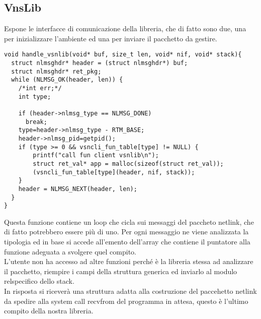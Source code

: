 \subsection{VnsLib}
Espone le interfacce di comunicazione della libreria, che di fatto sono due, una per inizializzare l'ambiente ed una per inviare il pacchetto da gestire.\\
\begin{lstlisting}[style=CStyle]
void handle_vsnlib(void* buf, size_t len, void* nif, void* stack){
  struct nlmsghdr* header = (struct nlmsghdr*) buf;
  struct nlmsghdr* ret_pkg;
  while (NLMSG_OK(header, len)) {
    /*int err;*/
    int type;

    if (header->nlmsg_type == NLMSG_DONE)
      break;
    type=header->nlmsg_type - RTM_BASE;
    header->nlmsg_pid=getpid();
    if (type >= 0 && vsncli_fun_table[type] != NULL) {
        printf("call fun client vsnlib\n");
        struct ret_val* app = malloc(sizeof(struct ret_val));
        (vsncli_fun_table[type](header, nif, stack));
    }
    header = NLMSG_NEXT(header, len);
  }
}
\end{lstlisting}
Questa funzione contiene un loop che cicla sui messaggi del paccheto netlink, che di fatto potrebbero essere pi\`u di uno. Per ogni messaggio ne viene analizzata la tipologia ed in base si accede all'emento dell'array che contiene il puntatore alla funzione adeguata a svolgere quel compito.\\
L'utente non ha accesso ad altre funzioni perch\'e \`e la libreria stessa ad analizzare il pacchetto, riempire i campi della struttura generica ed inviarlo al modulo relspecifico dello stack.\\
In risposta si ricever\`a una struttura adatta alla costruzione del paccehetto netlink da spedire alla system call recvfrom del programma in attesa, questo \`e l'ultimo compito della nostra libreria.
